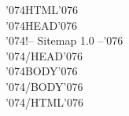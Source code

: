 \documentclass{article}
\def\lt{\char'074}
\def\gt{\char'076}
\newcommand{\Tag}[1]{{\lt}#1{\gt}}
\begin{document}
\Tag{HTML}\\
\Tag{HEAD}\\
\Tag{!-- Sitemap 1.0 --}\\
\Tag{/HEAD}\\
\Tag{BODY}\\

%
\Tag{/BODY}\\
\Tag{/HTML}\\
\end{document}

